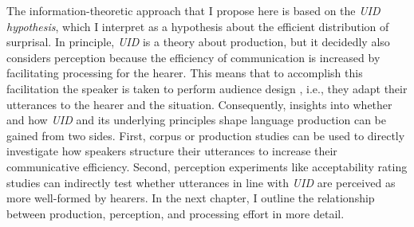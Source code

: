The information-theoretic approach that I propose here is based on the \textit{UID hypothesis}, which I interpret as a hypothesis about the efficient distribution of surprisal.
In principle, \textit{UID} is a theory about production,  but it decidedly also considers perception because the efficiency of communication is increased by facilitating processing for the hearer.
This means that to accomplish this facilitation the speaker is taken to perform audience design  \citep{bell1984}, i.e., they adapt their utterances to the hearer and the situation.
Consequently, insights into whether and how \textit{UID} and its underlying principles shape language production can be gained from two sides. 
First, corpus or production  studies can be used to directly investigate how speakers structure their utterances to increase their communicative efficiency.
Second, perception experiments like acceptability rating studies can indirectly test whether utterances in line with \textit{UID} are perceived as more well-formed by hearers.
In the next chapter, I outline the relationship between production, perception, and processing effort in more detail.
